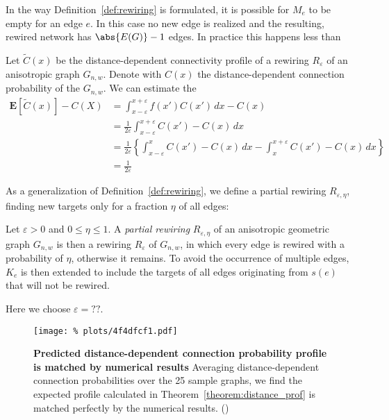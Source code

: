 \begin{remark} In the way Definition~\ref{def:rewiring} is formulated,
  it is possible for $M_e$ to be empty for an edge $e$. In this case
  no new edge is realized and the resulting, rewired network has
  $\abs{E(G)}-1$ edges. In practice this happens less than
\end{remark}

Let $\tilde{C}(x)$ be the distance-dependent connectivity profile of a
rewiring $R_{\varepsilon}$ of an anisotropic graph $G_{n,w}$. Denote
with $C(x)$ the distance-dependent connection probability of the
$G_{n,w}$. We can estimate the
\begin{align*}
  \mathbf{E}[\tilde{C}(x)] - C(X) 
    & = \int_{x-\varepsilon}^{x+\varepsilon} f(x') C(x') \, dx -
        C(x)\\
    & = \frac{1}{2\varepsilon}\int_{x-\varepsilon}^{x+\varepsilon}
        C(x') - C(x) \, dx \\
    & = \frac{1}{2\varepsilon} \left\{ \int_{x-\varepsilon}^{x} C(x') -
        C(x) \, dx - \int_x^{x+\varepsilon} C(x') - C(x) \, dx
        \right\} \\
    & = \frac{1}{2\varepsilon} 
\end{align*}


As a generalization of Definition~\ref{def:rewiring}, we define a
partial rewiring $R_{\varepsilon, \eta}$, finding new targets only for
a fraction $\eta$ of all edges:

\begin{definition}Let $\varepsilon > 0$ and $0 \leq \eta \leq 1$. A
  \textit{partial rewiring} $R_{\varepsilon,\eta}$ of an anisotropic
  geometric graph $G_{n,w}$ is then a rewiring $R_{\varepsilon}$ of
  $G_{n,w}$, in which every edge is rewired with a probability of
  $\eta$, otherwise it remains. To avoid the occurrence of multiple
  edges, $K_e$ is then extended to include the targets of all edges
  originating from $s(e)$ that will not be rewired.
\end{definition}

Here we choose $\varepsilon = ??$.


\begin{figure}[H]
  \centering
  \texttt{[image: \%
    plots/4f4dfcf1.pdf]} 
  \captionsetup{skip=0pt}
  \caption{\textbf{Predicted distance-dependent connection probability
      profile is matched by numerical results} Averaging
    distance-dependent connection probabilities over the 25 sample
    graphs, we find the expected profile calculated in
    Theorem~\ref{theorem:distance_prof} is matched perfectly by the
    numerical results. () } %
  \label{fig:rewiring_dst_prf_compare}
\end{figure}


